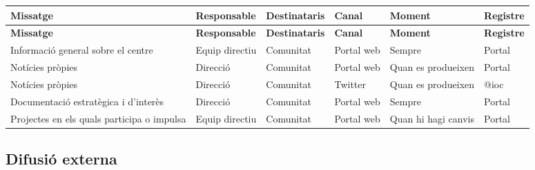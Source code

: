 \documentclass[fontsize=10pt,%
paper=a4,%
DIV=14,%
pagesize=auto,%
parskip=half,
captions=tableheading,%
numbers=noenddot,%
toc=graduated%
]{scrartcl}
\renewcommand{\arraystretch}{1.75}%
\renewcommand{\arraystretch}{1.75}%
\begin{document}
\small{
\setlength{\tabcolsep}{10pt}
\renewcommand{\arraystretch}{1.5}
\begin{longtable}{p{3cm}p{2cm}p{2cm}p{1.5cm}p{2cm}p{1.5cm}}
\hline
\textbf{Missatge}                          & \textbf{Responsable} & \textbf{Destinataris} & \textbf{Canal} & \textbf{Moment}     & \textbf{Registre} \\
\hline \endfirsthead
\hline
\textbf{Missatge}                          & \textbf{Responsable} & \textbf{Destinataris} & \textbf{Canal} & \textbf{Moment}     & \textbf{Registre} \\
\hline \endhead
Informació general sobre el centre         & Equip directiu       & Comunitat             & Portal web     & Sempre              & Portal            \\
Notícies pròpies                           & Direcció             & Comunitat             & Portal web     & Quan es produeixen  & Portal            \\
Notícies pròpies                           & Direcció             & Comunitat             & Twitter        & Quan es produeixen  & @ioc              \\
Documentació estratègica i d'interès       & Direcció             & Comunitat             & Portal web     & Sempre              & Portal            \\
Projectes en els quals participa o impulsa & Equip directiu       & Comunitat             & Portal web     & Quan hi hagi canvis & Portal            \\
\end{longtable}
}%

\subsection{Difusió externa}
\end{document}
